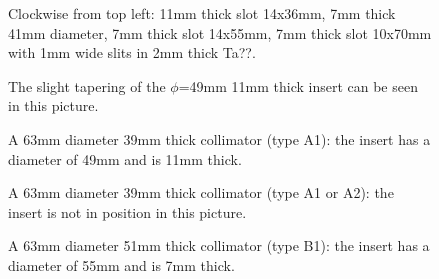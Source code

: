 \documentclass[11pt]{report}
\begin{document}
\begin{figure}[!ht]
\centerline{\vspace{0cm}\hspace{0cm}
}
\centering
\caption{Clockwise from top left: 11mm thick slot 14x36mm, 7mm thick 41mm diameter,
 7mm thick slot 14x55mm, 7mm thick slot 10x70mm with 1mm wide slits in 2mm thick Ta??.}
\label{fig:inserts-2}
\end{figure} 

\begin{figure}[!ht]
\centerline{\vspace{0cm}\hspace{0cm}
}
\centering
\caption{The slight tapering of the $\phi$=49mm 11mm thick insert can be seen in this picture.
}
\label{fig:49mm1mm-insert-tapering}
\end{figure} 



\begin{figure}[!ht]
\centerline{\vspace{0cm}\hspace{0cm}
}
\centering
\caption{A 63mm diameter 39mm thick collimator (type A1): the insert has a diameter of 49mm and is 11mm thick.}
\label{fig:big-63mm-coll-with-49mm11mminsert}
\end{figure} 

\begin{figure}[!ht]
\centerline{\vspace{0cm}\hspace{0cm}
}
\centering
\caption{A 63mm diameter 39mm thick collimator (type A1 or A2): the insert is not in position in this picture.}
\label{fig:big-63mm-coll-with-63mm7mminsert}
\end{figure} 

\begin{figure}[!ht]
\centerline{\vspace{0cm}\hspace{0cm}
}
\centering
\caption{A 63mm diameter 51mm thick collimator (type B1): the insert has a diameter of 55mm and is 7mm thick.}
\label{fig:63mm-coll-with-55mm7mminsert}
\end{figure} 
\end{document}
